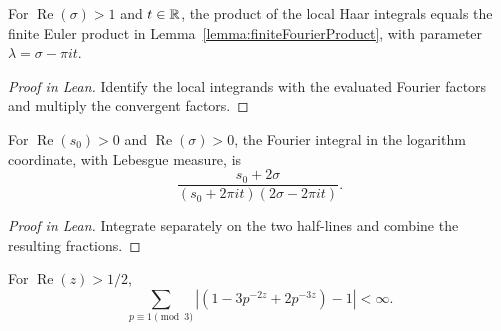 \begin{supportinglemma}

\label{helper:finiteIntegralProduct}


\leanok

For $\operatorname{Re}(\sigma)>1$ and $t\in\mathbb{R}$, the product of the local Haar integrals equals the finite Euler product in Lemma~\ref{lemma:finiteFourierProduct}, with parameter $\lambda=\sigma-\pi it$.

\end{supportinglemma}

\begin{proof}[Proof in Lean]

\leanok


Identify the local integrands with the evaluated Fourier factors and multiply the convergent factors.

\end{proof}

\begin{supportinglemma}

\label{helper:archimedeanIntegral}


\leanok

For $\operatorname{Re}(s_0)>0$ and $\operatorname{Re}(\sigma)>0$, the Fourier integral in the logarithm coordinate, with Lebesgue measure, is \[\frac{s_0+2\sigma}{(s_0+2\pi it)(2\sigma-2\pi it)}.\]

\end{supportinglemma}

\begin{proof}[Proof in Lean]

\leanok

Integrate separately on the two half-lines and combine the resulting fractions.

\end{proof}

\begin{supportinglemma}

\label{helper:correctionProduct}


\leanok

For $\operatorname{Re}(z)>1/2$, \[\sum_{p\equiv1\pmod3}\left|\left(1-3p^{-2z}+2p^{-3z}\right)-1\right|<\infty.\]

\end{supportinglemma}

